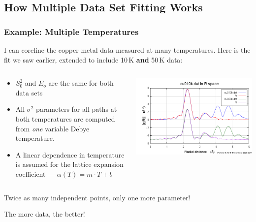 \documentclass[10pt, xcolor=x11names, compress]{beamer}
\begin{document}
\subsection[Explain]{How Multiple Data Set Fitting Works}
\begin{frame}
  \frametitle{Example: Multiple Temperatures}

  I can corefine the {\color{Green4}copper metal} data measured at
  many temperatures.  Here is the fit we saw earlier, extended to
  include 10\,K \textbf{and} 50\,K data:
  \begin{columns}
    \begin{column}{0.55\linewidth}
      \begin{itemize}
      \item $S_0^2$ and $E_o$ are the same for both data sets
      \item All $\sigma^2$ parameters for all paths at both
        temperatures are computed from \textit{one} variable Debye
        temperature.
      \item A linear dependence in temperature is assumed for the
        lattice expansion coefficient --- $\alpha(T) = m\cdot T+b$
      \end{itemize}
    \end{column}
    \begin{column}{0.45\linewidth}
      \includegraphics[width=\linewidth]{mds/cu10_150.png}
    \end{column}
  \end{columns}
  \begin{exampleblock}{}
    \begin{center}
      Twice as many independent points, only one more parameter!

      The more data, the better!
    \end{center}
  \end{exampleblock}
\end{frame}
\end{document}
